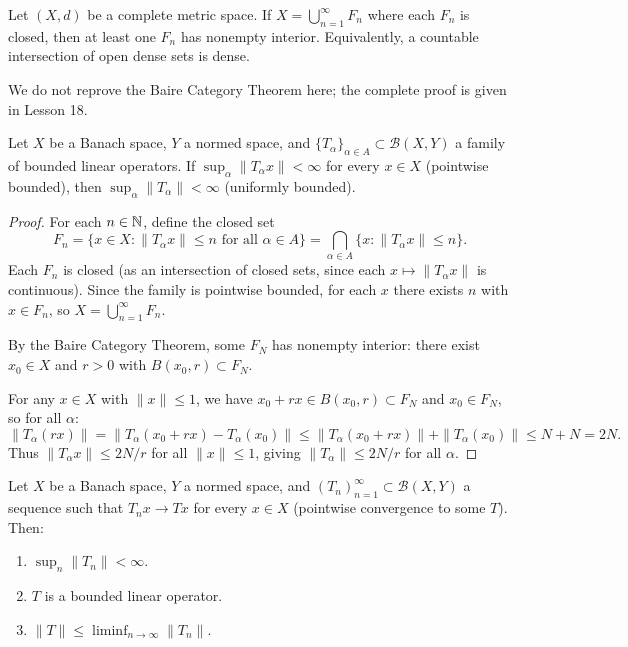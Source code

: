 \documentclass[11pt,a4paper]{article}
\begin{document}
\begin{theorem}
\label{thm:baire}
Let $(X, d)$ be a complete metric space. If
$X = \bigcup_{n=1}^\infty F_n$ where each $F_n$ is closed, then at
least one $F_n$ has nonempty interior. Equivalently, a countable
intersection of open dense sets is dense.
\end{theorem}

We do not reprove the Baire Category Theorem here; the complete proof
is given in Lesson 18.

\begin{theorem}
\label{thm:ubp}
Let $X$ be a Banach space, $Y$ a normed space, and
$\{T_\alpha\}_{\alpha \in A} \subset \mathcal{B}(X, Y)$ a family of
bounded linear operators. If
$\sup_\alpha \|T_\alpha x\| < \infty$ for every $x \in X$ (pointwise
bounded), then $\sup_\alpha \|T_\alpha\| < \infty$ (uniformly bounded).
\end{theorem}

\begin{proof}
For each $n \in \mathbb{N}$, define the closed set
\[
    F_n = \{x \in X : \|T_\alpha x\| \leq n
          \text{ for all } \alpha \in A\}
    = \bigcap_{\alpha \in A} \{x : \|T_\alpha x\| \leq n\}.
\]
Each $F_n$ is closed (as an intersection of closed sets, since each
$x \mapsto \|T_\alpha x\|$ is continuous). Since the family is pointwise
bounded, for each $x$ there exists $n$ with $x \in F_n$, so
$X = \bigcup_{n=1}^\infty F_n$.

By the Baire Category Theorem, some $F_N$ has nonempty interior: there
exist $x_0 \in X$ and $r > 0$ with $B(x_0, r) \subset F_N$.

For any $x \in X$ with $\|x\| \leq 1$, we have
$x_0 + rx \in B(x_0, r) \subset F_N$ and $x_0 \in F_N$, so for all
$\alpha$:
\[
    \|T_\alpha(rx)\| = \|T_\alpha(x_0 + rx) - T_\alpha(x_0)\|
    \leq \|T_\alpha(x_0 + rx)\| + \|T_\alpha(x_0)\| \leq N + N = 2N.
\]
Thus $\|T_\alpha x\| \leq 2N/r$ for all $\|x\| \leq 1$, giving
$\|T_\alpha\| \leq 2N/r$ for all $\alpha$.
\end{proof}

\begin{corollary}
\label{cor:pointwise-convergence}
Let $X$ be a Banach space, $Y$ a normed space, and
$(T_n)_{n=1}^\infty \subset \mathcal{B}(X, Y)$ a sequence such that
$T_n x \to Tx$ for every $x \in X$ (pointwise convergence to some
$T$). Then:
\begin{enumerate}[label=(\roman*)]
    \item $\sup_n \|T_n\| < \infty$.
    \item $T$ is a bounded linear operator.
    \item $\|T\| \leq \liminf_{n \to \infty} \|T_n\|$.
\end{enumerate}
\end{corollary}
\end{document}

